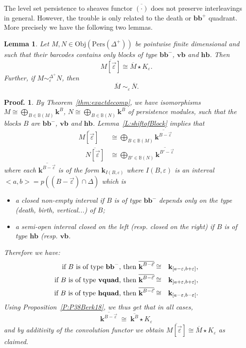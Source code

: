 \documentclass[a4paper, english, 11pt]{article}
\newcommand{\kk}[0]{\textbf{k}}
\newcommand{\Pe}{\text{Pers}}
\newcommand{\0}{\vec{0}}
\newcommand{\Obj}[0]{\text{Obj}}
\newtheorem*{pf}{Proof.} }
\newtheorem{lem}[prop]{Lemma}
\begin{document}
The level set persistence to sheaves functor $\overline{(\cdot)}$ does not preserve
interleavings in general. However, the trouble is only related to the death or $\textbf{bb}^+$ quadrant. More precisely we have the following two lemmas.
\begin{lem}\label{L:Barpreserveentre} Let $M, N\in \Obj(\Pe(\Delta^+))$ be pointwise finite dimensional and such that their barcodes contains only blocks of type $\textbf{bb}^{-}$, $\textbf{vb}$ and $\textbf{hb}$. 
Then $$\overline{M [\vec{\varepsilon}]} \cong \overline{M}\star K_{\varepsilon}. $$ Further, 
if $M \sim_\varepsilon^{\Delta^+} N$, then 
 $$ \overline{M} \; \sim_\varepsilon \, \overline{N}.$$
\end{lem}
\begin{pf}
 By Theorem~\ref{thm:exactdecomp}, we have  isomorphisms 
 $M \cong\bigoplus_{B\in \mathbb{B}(M)} \kk^B$, 
 $N \cong \bigoplus_{B\in \mathbb{B}(N)} \kk^B$ of persistence modules, such that the blocks $B$ are $\textbf{bb}^{-}$, $\textbf{vb}$ and $\textbf{hb}$. Lemma~\ref{L:shiftofBlock} 
 implies that 
 \begin{align*}\overline{M[\vec{\varepsilon}]} &\cong \bigoplus_{B\in \mathbb{B}(M)} \overline{\kk^{B -\vec{\varepsilon}}}  \\ 
  \quad \overline{N[\vec{\varepsilon}]} &\cong \bigoplus_{B'\in \mathbb{B}(N)} \overline{\kk^{B' -\vec{\varepsilon}} }
  \end{align*}
 where each $\overline{\kk^{B -\vec{\varepsilon}}}$ is of the form 
 $\kk_{I(B, \varepsilon)}$ where $I(B, \varepsilon)$ is an interval $<a,b>=p((B-\vec{\varepsilon})\cap \Delta)$ which is
 \begin{itemize}\item a closed non-empty interval if $B$ is of type $\textbf{bb}^{-}$ depends only on the type (death, birth, vertical...) of $B$; 
  \item a semi-open interval closed on the left (resp. closed on the right) if  $B$ is of type $\textbf{hb}$ (resp. $\textbf{vb}$.
 \end{itemize}
Therefore we have: 
\begin{eqnarray*} 
 \text{if $B$ is of type $\textbf{bb}^{-}$, then }  \overline{\kk^{B-\vec{\varepsilon}}} 
 & \cong & \kk_{[a-\varepsilon, b+\varepsilon ]}, \\
 \text{if $B$ is of type \textbf{vquad}, then }  \overline{\kk^{B-\vec{\varepsilon}}} 
 & \cong & \kk_{]a+\varepsilon, b+\varepsilon ]}, \\
 \text{if $B$ is of type \textbf{hquad}, then }  \overline{\kk^{B-\vec{\varepsilon}}} 
 & \cong & \kk_{[a-\varepsilon, b-\varepsilon [}.
\end{eqnarray*}
 Using Proposition~\ref{P:P38Berk18}, we thus get that  in all cases, 
 $$ \overline{\kk^{B-\vec{\varepsilon}}} 
 \; \cong \;  \overline{\kk^B} \star K_\varepsilon $$ and by additivity of the convolution functor we obtain $\overline{M [\vec{\varepsilon}]} \cong \overline{M}\star K_{\varepsilon}$ as claimed.
 

\end{pf}
\end{document}
